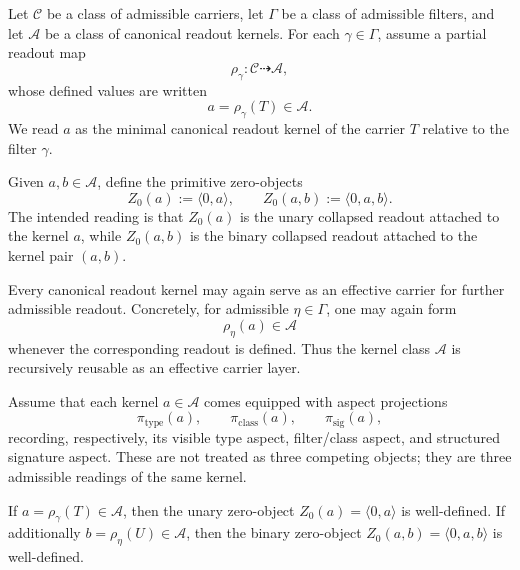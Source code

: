 \begin{definition}\label{def:qam-zero-kernel}
Let $\mathcal C$ be a class of admissible carriers, let $\Gamma$ be a class of admissible filters, and let $\mathcal A$ be a class of canonical readout kernels. For each $\gamma\in\Gamma$, assume a partial readout map
\[
\rho_\gamma:\mathcal C \dashrightarrow \mathcal A,
\]
whose defined values are written
\[
a=\rho_\gamma(T)\in\mathcal A.
\]
We read $a$ as the minimal canonical readout kernel of the carrier $T$ relative to the filter $\gamma$.
\end{definition}

\begin{definition}\label{def:qam-zero-objects}
Given $a,b\in\mathcal A$, define the primitive zero-objects
\[
Z_0(a):=\langle 0,a\rangle,
\qquad
Z_0(a,b):=\langle 0,a,b\rangle.
\]
The intended reading is that $Z_0(a)$ is the unary collapsed readout attached to the kernel $a$, while $Z_0(a,b)$ is the binary collapsed readout attached to the kernel pair $(a,b)$.
\end{definition}

\begin{axiom}\label{ax:qam-zero-recursive}
Every canonical readout kernel may again serve as an effective carrier for further admissible readout. Concretely, for admissible $\eta\in\Gamma$, one may again form
\[
\rho_\eta(a)\in\mathcal A
\]
whenever the corresponding readout is defined. Thus the kernel class $\mathcal A$ is recursively reusable as an effective carrier layer.
\end{axiom}

\begin{definition}\label{def:qam-kernel-aspects}
Assume that each kernel $a\in\mathcal A$ comes equipped with aspect projections
\[
\pi_{\mathrm{type}}(a),\qquad
\pi_{\mathrm{class}}(a),\qquad
\pi_{\mathrm{sig}}(a),
\]
recording, respectively, its visible type aspect, filter/class aspect, and structured signature aspect. These are not treated as three competing objects; they are three admissible readings of the same kernel.
\end{definition}

\begin{lemma}\label{lem:qam-zero-collapse}
If $a=\rho_\gamma(T)\in\mathcal A$, then the unary zero-object $Z_0(a)=\langle 0,a\rangle$ is well-defined. If additionally $b=\rho_\eta(U)\in\mathcal A$, then the binary zero-object $Z_0(a,b)=\langle 0,a,b\rangle$ is well-defined.
\end{lemma}

